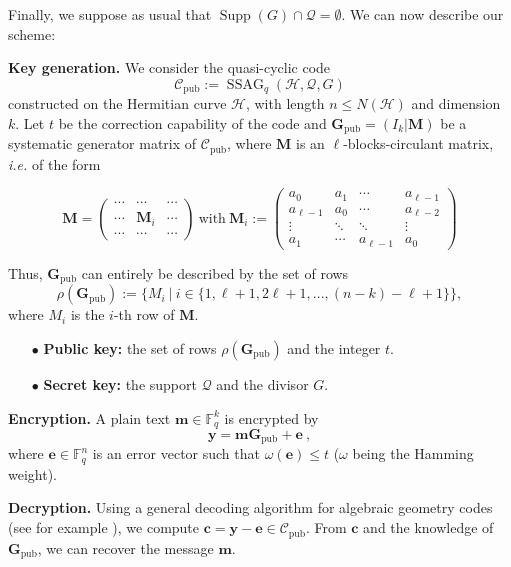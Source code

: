\documentclass[10pt]{article}
\theoremstyle{definition}
\theoremstyle{definition}
\theoremstyle{definition}
\newcommand{\Fq}{\mathbb{F}_q}
\newcommand{\w}{\omega}
\newcommand{\QR}{\mathcal{Q}}
\newcommand{\Supp}{\operatorname{Supp}}
\newcommand{\ssag}{\operatorname{SSAG}}
\begin{document}
Finally, we suppose as usual that $\Supp(G)\cap \QR = \emptyset$. We can now describe our scheme: 



 \textbf{Key generation.} We consider the quasi-cyclic code 
\[\mathcal{C}_{\mathrm{pub}} := \ssag_q(\mathcal{H},\QR,G)\]
constructed on the Hermitian curve $\mathcal{H}$, with length $n \leq N(\mathcal{H})$ and dimension $k$. Let $t$ be the correction capability of the code and $\mathbf{G}_{\mathrm{pub}} = (I_k | \mathbf{M})$ be a systematic generator matrix of $\mathcal{C}_{\mathrm{pub}}$, where $\mathbf{M}$ is an $\ell$-blocks-circulant matrix, \textit{i.e.} of the form 

\begin{equation*}
\mathbf{M}= \begin{pmatrix}
\cdots & \cdots & \cdots \\
\cdots & \mathbf{M}_i & \cdots \\
\cdots & \cdots & \cdots
\end{pmatrix}
\ \mathrm{with} \ \mathbf{M}_i := \begin{pmatrix}
a_0 & a_1 & \cdots & a_{\ell-1} \\
a_{\ell-1} & a_0 & \cdots & a_{\ell-2} \\
\vdots & \ddots & \ddots & \vdots \\
a_1 & \cdots & a_{\ell-1} & a_0 
\end{pmatrix}
\end{equation*}

 Thus, $\mathbf{G}_{\mathrm{pub}}$ can entirely be described by the set of rows
\[\rho(\mathbf{G}_{\mathrm{pub}}) := \{M_i \ | \ i \in \{1,\ell+1,2\ell+1,...,(n-k)-\ell+1\}\},\]
where $M_i$ is the $i$-th row of $\mathbf{M}$. 

\begin{enumerate}
\item[$\bullet$] \textbf{Public key:} the set of rows $\rho(\mathbf{G}_{\mathrm{pub}})$ and the integer $t$.
\item[$\bullet$] \textbf{Secret key:} the support $\QR$ and the divisor $G$.
\end{enumerate}

 \textbf{Encryption.} A plain text $\mathbf{m} \in \Fq^k$ is encrypted by 
\[ \mathbf{y}  = \mathbf{m}\mathbf{G}_{\mathrm{pub}} + \mathbf{e} \ ,\]
where $\mathbf{e} \in \Fq^n$ is an error vector such that $\w(\mathbf{e}) \leq t$ ($\w$ being the Hamming weight). 



 \textbf{Decryption.} Using a general decoding algorithm for algebraic geometry codes (see for example \cite{THRP}), we compute $\mathbf{c} = \mathbf{y} - \mathbf{e} \in \mathcal{C}_{\mathrm{pub}}$. From $\mathbf{c}$ and the knowledge of $\mathbf{G}_{\mathrm{pub}}$, we can recover the message $\mathbf{m}$. 
\end{document}
